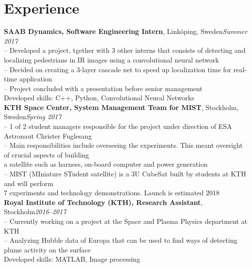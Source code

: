 \documentclass[10pt]{article}
\begin{document}
\section*{Experience}
\vspace{0.2em}
\hline
\vspace{0.5em}

\noindent\textbf{SAAB Dynamics, Software Engineering Intern}, Linköping, Sweden\hfill\textit{Summer 2017}\\
\indent-- Developed a project, tgether with 3 other interns that consists of detecting and localizing pedestrians in IR images using a convolutional neural network\\
\indent-- Decided on creating a 3-layer cascade net to speed up localization time for real-time application\\
\indent-- Project concluded with a presentation before senior management\\
\indent Developed skills: C++, Python, Convolutional Neural Networks\\

\noindent\textbf{KTH Space Center, System Management Team for MIST}, Stockholm, Sweden\hfill\textit{Spring 2017}\\
\indent-- 1 of 2 student managers responsible for the project under direction of ESA Astronaut Christer Fuglesang\\
\indent-- Main responsibilities include overseeing the experiments. This meant oversight of crucial aspects of building \\\indent\hspace{0.2cm}a satellite such as harness, on-board computer and power generation\\
\indent-- MIST (MIniature STudent satellite) is a 3U CubeSat built by students at KTH and will perform\\\indent\hspace{0.2cm} 7 experiments and technology demonstrations. Launch is estimated 2018\\

\noindent\textbf{Royal Institute of Technology (KTH), Research Assistant}, Stockholm\hfill\textit{2016--2017}\\
\indent-- Currently working on a project at the Space and Plasma Physics department at KTH\\
\indent-- Analyzing Hubble data of Europa that can be used to find ways of detecting plume activity on the surface\\
\indent Developed skills: MATLAB, Image processing\\
\end{document}
